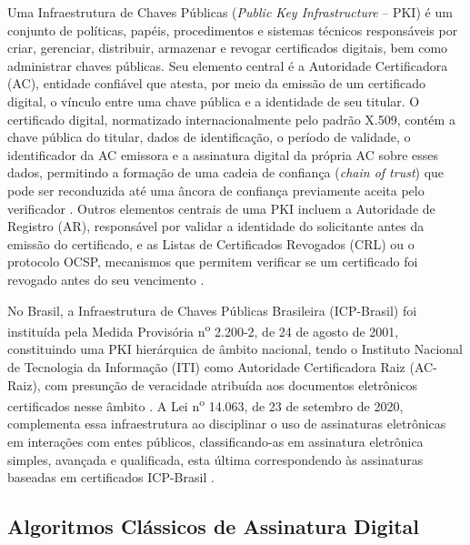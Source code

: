 \documentclass[
    12pt,
    a4paper,
    oneside,
    chapter=TITLE,
    section=TITLE,
    subsection=TITLE,
    subsubsection=TITLE,
    sumario=tradicional,
    english,
    brazil
]{abntex2}
\begin{document}
Uma Infraestrutura de Chaves Públicas (\emph{Public Key
Infrastructure} -- PKI) é um conjunto de políticas, papéis,
procedimentos e sistemas técnicos responsáveis por criar, gerenciar,
distribuir, armazenar e revogar certificados digitais, bem como
administrar chaves públicas. Seu elemento central é a Autoridade
Certificadora (AC), entidade confiável que atesta, por meio da
emissão de um certificado digital, o vínculo entre uma chave pública
e a identidade de seu titular. O certificado digital, normatizado
internacionalmente pelo padrão X.509, contém a chave pública do
titular, dados de identificação, o período de validade, o
identificador da AC emissora e a assinatura digital da própria AC
sobre esses dados, permitindo a formação de uma cadeia de confiança
(\emph{chain of trust}) que pode ser reconduzida até uma âncora de
confiança previamente aceita pelo verificador \cite{cooper2008}.
Outros elementos centrais de uma PKI incluem a Autoridade de Registro
(AR), responsável por validar a identidade do solicitante antes da
emissão do certificado, e as Listas de Certificados Revogados (CRL)
ou o protocolo OCSP, mecanismos que permitem verificar se um
certificado foi revogado antes do seu vencimento \cite{cooper2008}.

No Brasil, a Infraestrutura de Chaves Públicas Brasileira (ICP-Brasil)
foi instituída pela Medida Provisória n\textsuperscript{o} 2.200-2, de
24 de agosto de 2001, constituindo uma PKI hierárquica de âmbito
nacional, tendo o Instituto Nacional de Tecnologia da Informação
(ITI) como Autoridade Certificadora Raiz (AC-Raiz), com presunção de
veracidade atribuída aos documentos eletrônicos certificados nesse
âmbito \cite{brasil2001}. A Lei n\textsuperscript{o} 14.063, de 23 de
setembro de 2020, complementa essa infraestrutura ao disciplinar o
uso de assinaturas eletrônicas em interações com entes públicos,
classificando-as em assinatura eletrônica simples, avançada e
qualificada, esta última correspondendo às assinaturas baseadas em
certificados ICP-Brasil \cite{brasil2020}.

\subsection{Algoritmos Clássicos de Assinatura Digital}
\end{document}
